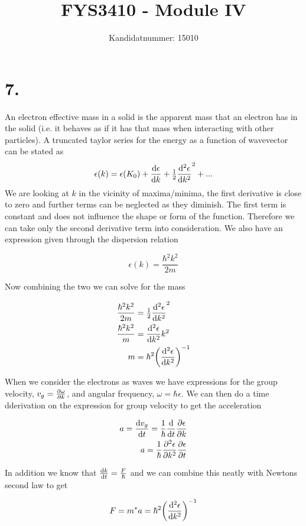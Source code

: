 \documentclass{article}
\author{Kandidatnummer: 15010}
\title{FYS3410 - Module IV}
\begin{document}
\maketitle

\section*{7. }
An electron effective mass in a solid is the apparent mass that an electron has in the solid (i.e. it behaves as if it has that mass when interacting with other particles).
A truncated taylor series for the energy as a function of wavevector can be stated as
$$ \epsilon(k) = \epsilon(K_0) + \dv{\epsilon}{k} (k-k_0) + \tfrac{1}{2}\dv[2]{\epsilon}{k} (k-k_0)^2 + ...$$
We are looking at $k$ in the vicinity of maxima/minima, the first derivative is close to zero and further terms can be neglected as they diminish.
The first term is constant and does not influence the shape or form of the function.
Therefore we can take only the second derivative term into consideration.
We also have an expression given through the dispersion relation

$$ \epsilon(k) = \frac{\hbar^2k^2}{2m} $$

Now combining the two we can solve for the mass

\begin{align*}
	\frac{\hbar^2k^2}{2m} &= \tfrac{1}{2}\dv[2]{\epsilon}{k} (k-k_0)^2\\
	\frac{\hbar^2k^2}{m} &= \dv[2]{\epsilon}{k}k^2\\
	m &= \hbar^2\qty(\dv[2]{\epsilon}{k})^{-1}
\end{align*}

When we consider the electrons as waves we have expressions for the group velocity, $v_g = \pdv{\omega}{k}$, and angular frequency, $\omega = \hbar \epsilon$. We can then do a time dderivation on the expression for group velocity to get the acceleration

\begin{align*}
	a = \dv{v_g}{t} = \frac{1}{\hbar}\dv{}{t}\pdv{\epsilon}{k}\\
	a = \frac{1}{\hbar}\pdv[2]{\epsilon}{k}\pdv{\epsilon}{t}
\end{align*}

In addition we know that $\dv{k}{t} = \frac{F}{\hbar}$ and we can combine this neatly with Newtons second law to get

\begin{align*}
	F=m^*a = \hbar^2\qty(\dv[2]{\epsilon}{k})^{-1}
\end{align*}
\end{document}
